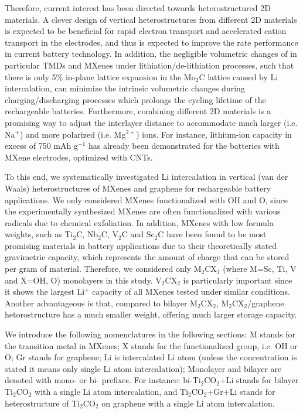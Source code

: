Therefore, current interest has been directed towards heterostructured\cite{C5CS00937E,Pomerantseva_Gogotsi_2017} 2D materials. A clever design of vertical heterostructures from different 2D materials is expected to be beneficial for rapid electron transport and accelerated cation transport in the electrodes, and thus is expected to improve the rate performance in current battery technology\cite{Pomerantseva_Gogotsi_2017}. In addition, the negligible volumetric changes of in particular TMDs and MXenes under lithiation/de-lithiation processes, such that there is only 5\% in-plane lattice expansion in the Mo$_2$C lattice caused by Li intercalation\cite{C6TA01918H}, can minimize the intrinsic volumetric changes during charging/discharging processes which prolongs the cycling lifetime of the rechargeable batteries. Furthermore, combining different 2D materials is a promising way to adjust the interlayer distance to accommodate much larger (i.e. Na$^{+}$) and more polarized (i.e. Mg$^{2+}$) ions. For instance, lithium-ion capacity in excess of 750 mAh g$^{-1}$\cite{CELC:CELC201600059} has already been demonstrated for the batteries with MXene  electrodes, optimized with CNTs.

To this end, we  systematically investigated Li intercalation in vertical (van der Waals) heterostructures of MXenes and graphene for rechargeable battery applications. We only considered MXenes functionalized  with  OH and O, since the experimentally synthesized MXenes are often functionalized with various radicals due to chemical exfoliation. In addition, MXenes with low formula weights, such as Ti$_2$C, Nb$_2$C, V$_2$C and Sc$_2$C have been found to be most promising\cite{doi:10.1021/ja405735d} materials in battery applications due to their theoretically stated gravimetric capacity, which represents the amount of charge that can be stored per gram of material. Therefore, we considered only M$_2$CX$_2$ (where M=Sc, Ti, V and X=OH, O) monolayers in this study. V$_2$CX$_2$ is particularly important since it shows the largest Li$^+$ capacity of all MXenes tested under similar conditions\cite{doi:10.1021/ja508154e}. Another advantageous is that, compared to bilayer M$_2$CX$_2$, M$_2$CX$_2$/graphene hetorostructure has a much smaller weight, offering much larger storage capacity. 

We introduce the following nomenclatures in the following sections: M stands for the transition metal in MXenes; X stands for the functionalized group, i.e. OH or O; Gr stands for graphene; Li is intercalated Li atom (unless the concentration is stated it means only single Li atom intercalation); Monolayer and bilayer are denoted with mono- or bi- prefixes. For instance: bi-Ti$_2$CO$_2$+Li stands for bilayer Ti$_2$CO$_2$ with a single Li atom intercalation, and Ti$_2$CO$_2$+Gr+Li stands for heterostructure of Ti$_2$CO$_2$ on graphene with a single Li atom intercalation. 

